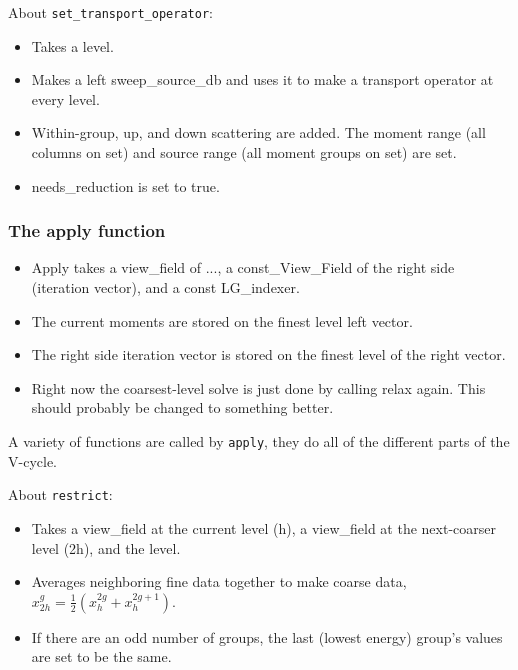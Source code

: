 \documentclass[12pt, letterpaper]{article}
\begin{document}
\noindent About \verb+set_transport_operator+:
\begin{itemize}
  \item Takes a level.
  \item Makes a left sweep\_source\_db and uses it to make a transport operator at every level.
  \item Within-group, up, and down scattering are added. The moment range (all columns on set) and source range (all moment groups on set) are set. 
  \item needs\_reduction is set to true.
\end{itemize}

\subsubsection{The apply function}
\begin{itemize}
  \item Apply takes a view\_field of ..., a const\_View\_Field of the right side (iteration vector), and a const LG\_indexer.
  \item The current moments are stored on the finest level left vector.
  \item The right side iteration vector is stored on the finest level of the right vector.
  \item Right now the coarsest-level solve is just done by calling relax again. This should probably be changed to something better.
\end{itemize}

\noindent A variety of functions are called by \verb+apply+, they do all of the different parts of the V-cycle. 

\noindent About \verb+restrict+:
\begin{itemize}
  \item Takes a view\_field at the current level (h), a view\_field at the next-coarser level (2h), and the level.
  \item Averages neighboring fine data together to make coarse data, $x_{2h}^{g} = \frac{1}{2}(x_{h}^{2g} + x_{h}^{2g+1})$.
  \item If there are an odd number of groups, the last (lowest energy) group's values are set to be the same.
\end{itemize}
\end{document}
